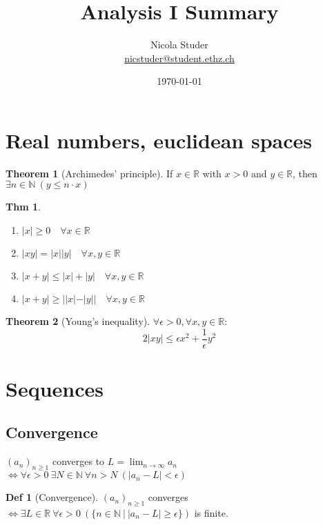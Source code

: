 \documentclass[a4paper, 10pt]{article}
\title{Analysis I Summary}
\author{Nicola Studer \\ \href{mailto:nicstuder@student.ethz.ch}{nicstuder@student.ethz.ch}}
\date{\today}
\theoremstyle{definition}
\newtheorem*{theorem}{Thm}
\newtheorem*{definition}{Def}
\theoremstyle{ex}
\theoremstyle{named}
\newtheorem*{ntheorem_wrapper}{Theorem}
\newenvironment{ntheorem}%
    {\begin{mdframed}[style=important]\begin{ntheorem_wrapper}}%
    {\end{ntheorem_wrapper}\end{mdframed}}
\newcommand{\R}{\mathbb{R}}
\newcommand{\N}{\mathbb{N}}
\begin{document}
\maketitle

\section{Real numbers, euclidean spaces}
\begin{ntheorem}[Archimedes' principle]
    If $x \in \R$ with $x > 0$ and $y \in \R$, then $\exists n \in \N \ (y \leq n \cdot x)$
\end{ntheorem}

\begin{theorem}
    \begin{enumerate}[label=(\roman*)]
        \item $|x| \geq 0 \quad \forall x \in \R$
        \item $|xy| = |x||y| \quad \forall x, y \in \R$
        \item $|x + y| \leq |x| + |y| \quad \forall x, y \in \R$
        \item $|x + y| \geq ||x| - |y|| \quad \forall x, y \in \R$
    \end{enumerate}
\end{theorem}

\begin{ntheorem}[Young's inequality]
    $\forall \epsilon > 0, \forall x, y \in \R$:
    $$2 |xy| \leq \epsilon x^2 + \frac{1}{\epsilon} y^2$$
\end{ntheorem}

\section{Sequences}
\subsection{Convergence}
$(a_n)_{n \geq 1}$ converges to $L = \lim_{n \to \infty} a_n$ \\
$\iff \forall \epsilon > 0 \ \exists N \in \N \ \forall n > N \ (|a_n - L | < \epsilon)$

\begin{definition}[Convergence]
    $(a_n)_{n \geq 1}$ converges \\
    $\iff \exists L \in \R  \ \forall \epsilon > 0 \ (\{n \in \N \ | \ |a_n - L| \geq \epsilon \})$ is finite.
\end{definition}
\end{document}
